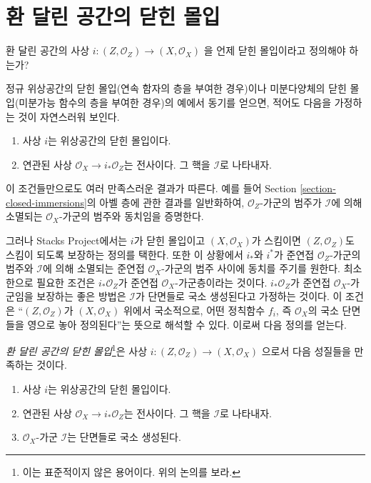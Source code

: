 \section{환 달린 공간의 닫힌 몰입}
\label{section-closed-immersion}

\noindent
환 달린 공간의 사상
$i : (Z, \mathcal{O}_Z) \to (X, \mathcal{O}_X)$
을 언제 닫힌 몰입이라고 정의해야 하는가?

\medskip\noindent
정규 위상공간의 닫힌 몰입(연속 함자의 층을 부여한 경우)이나
미분다양체의 닫힌 몰입(미분가능 함수의 층을 부여한 경우)의 예에서
동기를 얻으면, 적어도 다음을 가정하는 것이 자연스러워 보인다.
\begin{enumerate}
\item 사상 $i$는 위상공간의 닫힌 몰입이다.
\item 연관된 사상 $\mathcal{O}_X \to i_*\mathcal{O}_Z$는
전사이다. 그 핵을 $\mathcal{I}$로 나타내자.
\end{enumerate}
이 조건들만으로도 여러 만족스러운 결과가 따른다. 예를 들어
Section \ref{section-closed-immersions}의 아벨 층에 관한 결과를 일반화하여,
$\mathcal{O}_Z$-가군의 범주가 $\mathcal{I}$에 의해 소멸되는
$\mathcal{O}_X$-가군의 범주와 동치임을 증명한다.

\medskip\noindent
그러나 Stacks Project에서는 $i$가 닫힌 몰입이고
$(X, \mathcal{O}_X)$가 스킴이면 $(Z, \mathcal{O}_Z)$도 스킴이 되도록
보장하는 정의를 택한다. 또한 이 상황에서 $i_*$와 $i^*$가 준연접
$\mathcal{O}_Z$-가군의 범주와 $\mathcal{I}$에 의해 소멸되는 준연접
$\mathcal{O}_X$-가군의 범주 사이에 동치를 주기를 원한다.
최소한으로 필요한 조건은 $i_*\mathcal{O}_Z$가 준연접
$\mathcal{O}_X$-가군층이라는 것이다. $i_*\mathcal{O}_Z$가 준연접
$\mathcal{O}_X$-가군임을 보장하는 좋은 방법은 $\mathcal{I}$가
단면들로 국소 생성된다고 가정하는 것이다.
이 조건은 ``$(Z, \mathcal{O}_Z)$가 $(X, \mathcal{O}_X)$ 위에서 국소적으로,
어떤 정칙함수 $f_i$, 즉 $\mathcal{O}_X$의 국소 단면들을 영으로 놓아
정의된다''는 뜻으로 해석할 수 있다. 이로써 다음 정의를 얻는다.

\begin{definition}
\label{definition-closed-immersion}
{\it 환 달린 공간의 닫힌 몰입}\footnote{이는 표준적이지 않은 용어이다.
위의 논의를 보라.}은 사상
$i : (Z, \mathcal{O}_Z) \to (X, \mathcal{O}_X)$
으로서 다음 성질들을 만족하는 것이다.
\begin{enumerate}
\item 사상 $i$는 위상공간의 닫힌 몰입이다.
\item 연관된 사상 $\mathcal{O}_X \to i_*\mathcal{O}_Z$는
전사이다. 그 핵을 $\mathcal{I}$로 나타내자.
\item $\mathcal{O}_X$-가군 $\mathcal{I}$는 단면들로 국소 생성된다.
\end{enumerate}
\end{definition}

